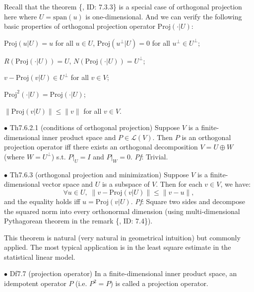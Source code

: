 \documentclass{article}
\begin{document}
\begin{Rmk}{}
    \textcolor{Th}{Recall that the theorem \{, ID: 7.3.3\} is a special case of orthogonal projection here where $U = \text{span}(u)$ is one-dimensional.} And we can verify the following basic properties of orthogonal projection operator $\text{Proj}(\cdot |U)$: 
    \textcolor{Th}{
    \begin{compactenum}
        \item $\text{Proj}(u|U) = u$ for all $u\in U$, $\text{Proj}(u^\perp|U) = 0$ for all $u^\perp\in U^\perp$;
        \item $R(\text{Proj}(\cdot |U)) = U$, $N(\text{Proj}(\cdot |U)) = U^\perp$;
        \item $v-\text{Proj}(v|U)\in U^\perp$ for all $v\in V$;
        \item $\text{Proj}^2(\cdot |U) = \text{Proj}(\cdot |U)$;
        \item $\|\text{Proj}(v|U)\| \leq \|v\|$ for all $v\in V$.
    \end{compactenum}
    }
\end{Rmk}

\begin{Th}{$\bullet$ Th7.6.2.1 (conditions of orthogonal projection)}
    Suppose $V$ is a finite-dimensional inner product space and $P\in\mathcal{L}(V)$. Then $P$ is an orthogonal projection operator iff there exists an orthogonal decomposition $V = U\oplus W$ (where $W = U^\perp$) s.t. $P|_U = I$ and $P|_W = 0$.
    \tcblower
    \textit{Pf}: Trivial.
\end{Th}

\begin{Th}{$\bullet$ Th7.6.3 (orthogonal projection and minimization)}
    Suppose $V$ is a finite-dimensional vector space and $U$ is a subspace of $V$. Then for each $v\in V$, we have:
    $$\forall u\in U, \; \|v-\text{Proj}(v|U)\|\leq \|v-u\|,$$
    and the equality holds iff $u=\text{Proj}(v|U)$. 
    \tcblower
    \textit{Pf}: Square two sides and decompose the squared norm into every orthonormal dimension (using multi-dimensional Pythagorean theorem in the remark \{, ID: 7.4\}).
\end{Th}

\begin{Rmk}{}
    This theorem is natural (very natural in geometrical intuition) but commonly applied. The most typical application is in the least square estimate in the statistical linear model.
\end{Rmk}

\begin{Df}{$\bullet$ Df7.7 (projection operator)}
    In a finite-dimensional inner product space, an idempotent operator $P$ (i.e. $P^2 = P$) is called a projection operator.
\end{Df}
\end{document}
